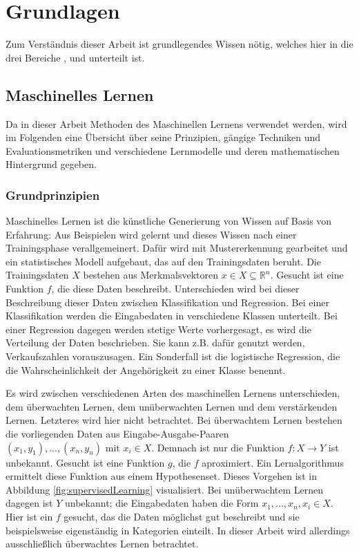 \chapter{Grundlagen}\label{grundlagen}

Zum Verständnis dieser Arbeit ist grundlegendes Wissen nötig, welches hier in die drei Bereiche ,  und  unterteilt ist.


\section{Maschinelles Lernen}\label{ml-grundlagen}

Da in dieser Arbeit Methoden des Maschinellen Lernens verwendet werden, wird im Folgenden eine Übersicht über seine Prinzipien, gängige Techniken und Evaluationsmetriken und verschiedene Lernmodelle und deren mathematischen Hintergrund gegeben.

	\subsection{Grundprinzipien}
	
	Maschinelles Lernen ist die \glqq künstliche\grqq{} Generierung von Wissen auf Basis von Erfahrung: Aus Beispielen wird gelernt und dieses Wissen nach einer Trainingsphase verallgemeinert. Dafür wird mit Mustererkennung gearbeitet und ein statistisches Modell aufgebaut, das auf den Trainingsdaten beruht. Die Trainingsdaten $X$ bestehen aus Merkmalsvektoren  $x \in X \subseteq \mathbb{R}^n$. Gesucht ist eine Funktion $f$, die diese Daten beschreibt. Unterschieden wird bei dieser Beschreibung dieser Daten zwischen Klassifikation und Regression. Bei einer Klassifikation werden die Eingabedaten in verschiedene Klassen unterteilt. Bei einer Regression dagegen werden stetige Werte vorhergesagt, es wird die Verteilung der Daten beschrieben. Sie kann z.B. dafür genutzt werden, Verkaufszahlen vorauszusagen. Ein Sonderfall ist die logistische Regression, die die Wahrscheinlichkeit der Angehörigkeit zu einer Klasse benennt.
	
	Es wird zwischen verschiedenen Arten des maschinellen Lernens unterschieden, dem überwachten Lernen, dem unüberwachten Lernen und dem verstärkenden Lernen. Letzteres wird hier nicht betrachtet. Bei überwachtem Lernen bestehen die vorliegenden Daten aus Eingabe-Ausgabe-Paaren $(x_1, y_1), ...,(x_n, y_n) \text{ mit } x_i \in X$. Demnach ist nur die Funktion $f: X \to Y$ ist unbekannt. Gesucht ist eine Funktion $g$, die $f$ aproximiert. Ein Lernalgorithmus ermittelt diese Funktion aus einem Hypothesenset. Dieses Vorgehen ist in Abbildung \ref{fig:supervisedLearning} visualisiert. Bei unüberwachtem Lernen dagegen ist $Y$ unbekannt; die Eingabedaten haben die Form $x_1, ..., x_n, x_i \in X$. Hier ist ein $f$ gesucht, das die Daten möglichst gut beschreibt und sie beispielsweise eigenständig in Kategorien einteilt. In dieser Arbeit wird allerdings ausschließlich überwachtes Lernen betrachtet.
	
